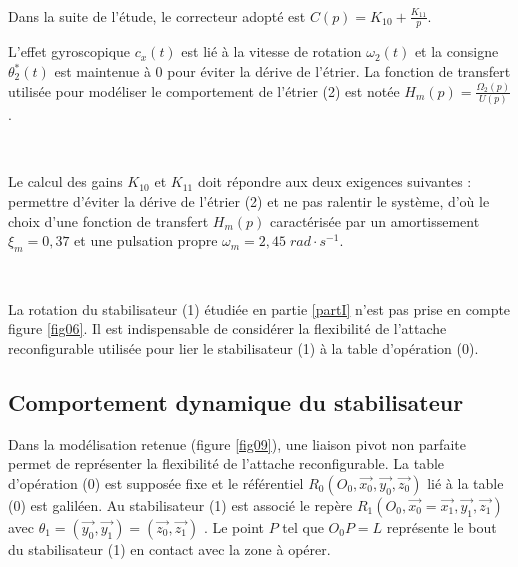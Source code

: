 



~\

Dans la suite de l'étude, le correcteur adopté est $C(p)=K_{10}+\frac{K_{11}}{p}$. 

L'effet gyroscopique $c_x(t)$ est lié à la vitesse de rotation $\omega_2(t)$ et la consigne $\theta_2^*(t)$ est maintenue à 0 pour éviter la dérive de l'étrier. La fonction de transfert utilisée pour modéliser le comportement de l'étrier (2) est notée $H_m(p)=\frac{\Omega_2(p)}{U(p)}$.


~\

Le calcul des gains $K_{10}$ et $K_{11}$ doit répondre aux deux exigences suivantes : permettre d'éviter la dérive de l'étrier (2) et ne pas ralentir le système, d'où le choix d'une fonction de transfert $H_m(p)$ caractérisée par un amortissement $\xi_m=0,37$ et une pulsation propre $\omega_m=2,45\;rad\cdot s^{-1}$.


~\

La rotation du stabilisateur (1) étudiée en partie \ref{partI} n'est pas prise en compte figure \ref{fig06}. Il est indispensable de considérer la flexibilité de l'attache reconfigurable utilisée pour lier le stabilisateur (1) à la table d'opération (0).

\subsection{Comportement dynamique du stabilisateur\label{partIII3}}

Dans la modélisation retenue (figure \ref{fig09}), une liaison pivot non parfaite permet de représenter la flexibilité de l'attache reconfigurable. La table d'opération (0) est supposée fixe et le référentiel $R_0(O_0,\overrightarrow{x_0},\overrightarrow{y_0},\overrightarrow{z_0})$ lié à la table (0) est galiléen. Au stabilisateur (1) est associé le repère $R_1(O_0,\overrightarrow{x_0}=\overrightarrow{x_1},\overrightarrow{y_1},\overrightarrow{z_1})$ avec $\theta_1=(\overrightarrow{y_0},\overrightarrow{y_1})=(\overrightarrow{z_0},\overrightarrow{z_1})$ . Le point $P$ tel que $O_0P=L$ représente le bout du stabilisateur (1) en contact avec la zone à opérer. 

